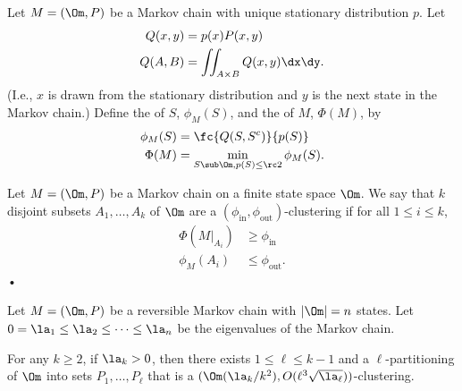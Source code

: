 \begin{df}\label{df:conduct}
Let $M=(\Om, P)$ be a Markov chain with unique stationary distribution $p$. Let
\begin{align}
Q(x,y) &= p(x) P(x,y)\\
Q(A,B) & = \iint_{A\times B} Q(x,y)\dx\dy.
\end{align}
(I.e., $x$ is drawn from the stationary distribution and $y$ is the next state in the Markov chain.)
Define the  of $S$, $\phi_M(S)$, and the  of $M$, $\Phi(M)$, by
\begin{align}
\phi_M(S) & = \fc{Q(S,S^c)}{p(S)}\\
\Phi(M) &= \min_{S\sub \Om, p(S)\le \rc 2}
\phi_M(S).
\end{align}
\end{df}

\begin{df}\label{df:in-out}
Let $M=(\Om,P)$ be a Markov chain on a finite state space $\Om$. 
We say that $k$ disjoint subsets $A_1,\ldots, A_k$ of $\Om$ are a $(\phi_{\text{in}}, \phi_{\text{out}})$-clustering if for all $1\le i\le k$,
\begin{align}
\Phi(M|_{A_i}) &\ge \phi_{\text{in}}\\
\phi_M(A_i)&\le \phi_{\text{out}}.
\end{align}•
\end{df}


\begin{thm}\label{thm:gt14}
Let $M=(\Om, P)$ be a reversible Markov chain with $|\Om|=n$ states. Let $0=\la_1\le \la_2\le \cdots\le \la_n$ be the eigenvalues of the Markov chain. %

For any $k\ge 2$, if $\la_k>0$, then there exists $1\le \ell\le k-1$ and a $\ell$-partitioning of $\Om$ into sets $P_1,\ldots, P_\ell$ that is a 
$
(\Om(\la_k/k^2), O(\ell^3\sqrt{\la_\ell}))
$-clustering.
\end{thm}

